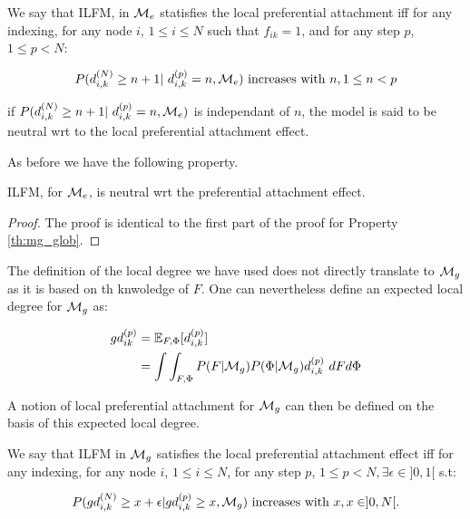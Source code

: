 \begin{definition}

We say that ILFM, in $\mathcal{M}_e$ statisfies the local preferential attachment iff for any indexing, for any node $i$, $1\leq i \leq N$ such that $f_{ik}=1$, and for any step $p$, $1\leq p < N$:

\begin{equation*}
P(d_{i,k}^{(N)} \geq n+1 | d_{i,k}^{(p)}=n,\M_e) \textrm{ increases with } n , 1\leq n < p
\end{equation*}

if $P(d_{i,k}^{(N)} \geq n+1 | d_{i,k}^{(p)}=n,\M_e)$ is independant of $n$, the model is said to be neutral wrt to the local preferential attachment effect.

As before we have the following property.

\begin{proposition}
ILFM, for $\mathcal{M}_e$, is neutral wrt the preferential attachment effect.
\end{proposition}

\begin{proof}
The proof is identical to the first part of the proof for Property \ref{th:mg_glob}.
\end{proof}

The definition of the local degree we have used does not directly translate to $\mathcal{M}_g$ as it is based on th knwoledge of $F$. One can nevertheless define an expected local degree for $\mathcal{M}_g$ as:

\begin{align*}
gd_{ik}^{(p)} &= \mathbb{E}_{F,\Phi}[d_{i,k}^{(p)}] \\
    &= \int\int_{F, \Phi} P(F|\mathcal{M}_g)P(\Phi|\mathcal{M}_g) d_{i,k}^{(p)}\ dF d\Phi
\end{align*}

A notion of local preferential attachment for $\mathcal{M}_g$ can then be defined on the basis of this expected local degree.

\begin{definition}
We say that ILFM in $\mathcal{M}_g$ satisfies the local preferential attachment effect iff for any indexing, for any node $i$, $1 \leq i \leq N$, for any step $p$, $1 \leq p < N, \exists \epsilon \in ]0,1[$ s.t:

\begin{equation*}
P(gd_{i,k}^{(N)} \geq x + \epsilon | gd_{i,k}^{(p)} \geq x, \mathcal{M}_g) \textrm{ increases with } x, x \in ]0,N[.
\end{equation*}


\end{definition}
\end{definition}
